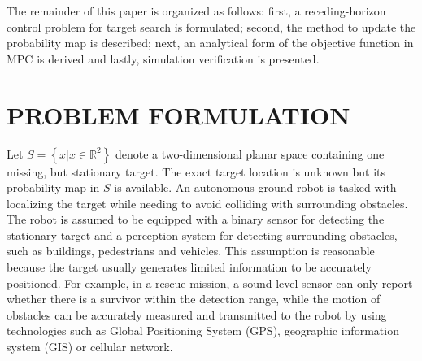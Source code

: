 \documentclass[twocolumn,10pt]{asme2e}
\begin{document}
The remainder of this paper is organized as follows: first, a receding-horizon control problem for target search is formulated;
second, the method to update the probability map is described;
next, an analytical form of the objective function in MPC is derived and
lastly, simulation verification is presented.

\section*{PROBLEM FORMULATION}\label{sec:formulation}
Let $\mathit{S}=\left\lbrace x|x\in \mathbb{R}^2\right\rbrace $ denote a two-dimensional planar space containing one missing, but stationary target.
The exact target location is unknown but its probability map in $S$ is available.
An autonomous ground robot is tasked with localizing the target while needing to avoid colliding with surrounding obstacles.
The robot is assumed to be equipped with a binary sensor for detecting the stationary target and a perception system for detecting surrounding obstacles, such as buildings, pedestrians and vehicles. 
This assumption is reasonable because the target usually generates limited information to be accurately positioned. 
For example, in a rescue mission, a sound level sensor can only report whether there is a survivor within the detection range, while the motion of obstacles can be accurately measured and transmitted to the robot by using technologies such as Global Positioning System (GPS), geographic information system (GIS) or cellular network.


\end{document}

